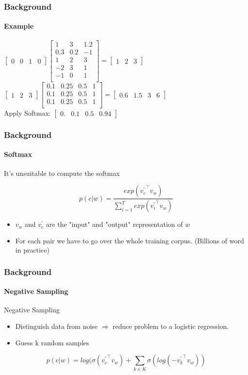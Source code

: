 \begin{frame}\frametitle{Background}\framesubtitle{Example}
$
\begin{bmatrix}
0 & 0 & 1 & 0 
\end{bmatrix}
\begin{bmatrix}
1 & 3 & 1.2  \\
0.3 & 0.2 & -1 \\
1 & 2 & 3 \\
-2 & 3 & 1 \\
-1 & 0 & 1 \\
\end{bmatrix}
= 
\begin{bmatrix}
1& 2 & 3
\end{bmatrix}
$
\bigskip
$
\begin{bmatrix}
1& 2 & 3
\end{bmatrix}
\begin{bmatrix}
0.1 & 0.25&0.5& 1  \\
0.1 & 0.25&0.5 & 1 \\
0.1 & 0.25&0.5 & 1 \\
\end{bmatrix}
= 
\begin{bmatrix}
0.6 & 1.5 & 3 & 6 
\end{bmatrix}
$
\bigskip 
\\Apply Softmax:
$
\begin{bmatrix}
0. & 0.1 & 0.5 & 0.94
\end{bmatrix}
$
\end{frame}

\begin{frame}\frametitle{Background}\framesubtitle{Softmax}
\begin{Large}
It's unsuitable to compute the softmax
\end{Large}
   \begin{equation}
  p(c|w) =  \frac{exp( {v^{'}_c}^\intercal v_w )}{\sum_{i=1}^T exp({v^{'}_i}^\intercal v_{w})}
   \end{equation}
   \begin{itemize}
   \item $v_w$ and $v^{'}_c$ are the "input" and "output" representation of $w$
\item For each pair we have to go over the whole training corpus. (Billions of word in practice) 
   \end{itemize}
\end{frame}

\begin{frame}\frametitle{Background}\framesubtitle{Negative Sampling}
\begin{large}
Negative Sampling
\end{large}
\begin{itemize}
\item Distinguish data from noise $\Rightarrow$ reduce problem to a logistic regression. 
\item Guess k random samples 
\end{itemize}
  \begin{equation}
  p(c|w) =  log(\sigma({v^{'}_c}^\intercal v_w ) + \sum_{k\in K} \sigma(log(-{v^{'}_k}^\intercal  v_w ))  
  \end{equation}
\end{frame}